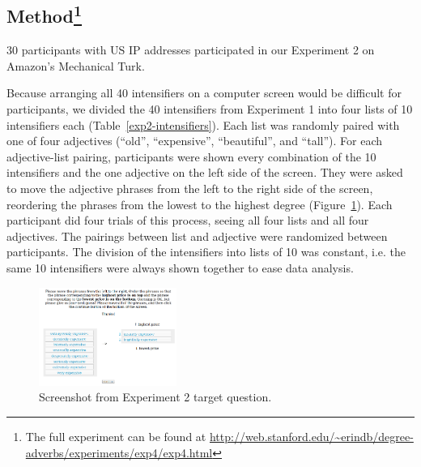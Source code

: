 \documentclass[10pt,letterpaper]{article}
\begin{document}
\subsection{Method\footnote{The full experiment can be found at \url{http://web.stanford.edu/~erindb/degree-adverbs/experiments/exp4/exp4.html}}}

30 participants with US IP addresses participated in our Experiment 2 on Amazon's Mechanical Turk.

Because arranging all 40 intensifiers on a computer screen would be difficult for participants, we divided the 40 intensifiers from Experiment 1 into four lists of 10 intensifiers each (Table~\ref{exp2-intensifiers}).
Each list was randomly paired with one of four adjectives (``old'', ``expensive'', ``beautiful'', and ``tall'').
For each adjective-list pairing, participants were shown every combination of the 10 intensifiers and the one adjective on the left side of the screen.
They were asked to move the adjective phrases from the left to the right side of the screen, reordering the phrases from the lowest to the highest degree (Figure~\ref{exp2-q}).
Each participant did four trials of this process, seeing all four lists and all four adjectives.
The pairings between list and adjective were randomized between participants.
The division of the intensifiers into lists of 10 was constant, i.e. the same 10 intensifiers were always shown together to ease data analysis.

\begin{figure}[ht]
\begin{center}
\includegraphics[width=0.4\textwidth]{analysis_files_for_writeup/images/exp2-q.png}
\end{center}
\caption{Screenshot from Experiment 2 target question.} 
\label{exp2-q}
\end{figure}
\end{document}
